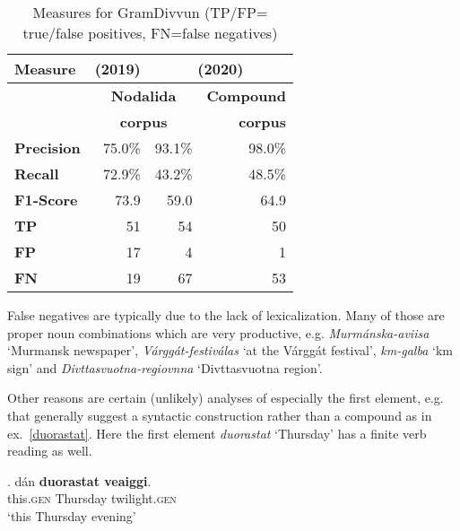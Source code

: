 \documentclass[free]{flammie}
\begin{document}
\begin{table}[h]
 \begin{center}
\begin{tabular}{|l|r|r|r|}
\hline
\textbf{Measure} & (2019) & \multicolumn{2}{|c|}{(2020)} \\
\hline
\textbf{}  & \multicolumn{2}{|c|}{\textbf{Nodalida}}  & \textbf{Compound} \\ %
\textbf{}  & \multicolumn{2}{|c|}{\textbf{corpus}}  & \textbf{corpus} \\
\hline
\hline
\textbf{Precision}    &  75.0\% & 93.1\% & 98.0\% \\
\textbf{Recall}       &  72.9\% & 43.2\% & 48.5\% \\
\textbf{F1-Score}     &   73.9 & 59.0    & 64.9\\
\hline
\hline
\textbf{TP}           & 51 & 54 & 50 \\
\textbf{FP}           & 17 & 4  & 1 \\
\textbf{FN}           & 19 & 67 & 53\\
\hline
\end{tabular}
\caption{Measures for GramDivvun (TP/FP= true/false
    positives, FN=false negatives)\label{quantevaltbl}}
\end{center}
\end{table}


False negatives are typically due to the lack of lexicalization.
Many of those are proper noun combinations which are very productive, e.g. \textit{Murmánska-aviisa} `Murmansk newspaper', \textit{Várggát-festiválas} `at the Várggát festival', \textit{km-galba} `km sign' and \textit{Divttasvuotna-regiovnna} `Divttasvuotna region'. %

Other reasons are certain (unlikely) analyses of especially the first element, e.g.
that generally suggest a syntactic construction rather than a compound as in
    ex.~\ref{duorastat}. Here the first element \textit{duorastat} `Thursday' has a finite verb reading as well.


\exg. dán \textbf{duorastat veaiggi}.\label{duorastat}\\ %
this\textsc{.gen} {Thursday twilight\textsc{.gen}}\\ %
`this Thursday evening'
\end{document}
